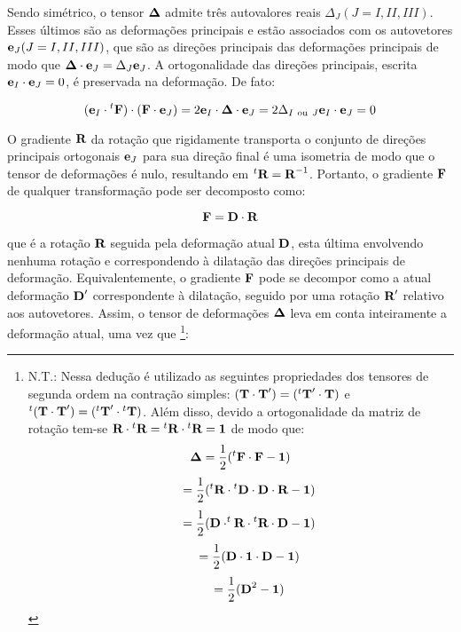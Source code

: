 \documentclass[
	11pt, %
	fleqn, %
	a4paper, %
]{LegrandOrangeBook}
\begin{document}
Sendo simétrico, o tensor $\bm{\Delta}$ admite três autovalores reais $\Delta_J (J=I,II,III)$. Esses últimos são as deformações principais e estão associados com os autovetores $\textbf{e}_J (J=I,II,III)$, que são as direções principais das deformações principais de modo que $\bm{\Delta} \cdot \textbf{e}_J = \Delta_J \textbf{e}_J$. A ortogonalidade das direções principais, escrita $\textbf{e}_I \cdot \textbf{e}_J = 0$, é preservada na deformação. De fato:

\begin{equation}
	\label{eq:eIFFeJ}	
	(\textbf{e}_I \cdot {}^t \textbf{F}) \cdot (\textbf{F} \cdot \textbf{e}_J) = 2\textbf{e}_I \cdot \bm{\Delta} \cdot \textbf{e}_J = 2 \Delta_{I~\text{ou}~J} \textbf{e}_I \cdot \textbf{e}_J = 0
\end{equation}

O gradiente $\textbf{R}$ da rotação que rigidamente transporta o conjunto de direções principais ortogonais $\textbf{e}_J$ para sua direção final é uma isometria de modo que o tensor de deformações é nulo, resultando em ${}^t\textbf{R} = \textbf{R}^{-1}$. Portanto, o gradiente $\textbf{F}$ de qualquer transformação pode ser decomposto como:

\begin{equation}
	\label{eq:F=DR}	
	\textbf{F} = \textbf{D} \cdot \textbf{R}
\end{equation}

que é a rotação $\textbf{R}$ seguida pela deformação atual $\textbf{D}$, esta última envolvendo nenhuma rotação e correspondendo à dilatação das direções principais de deformação. Equivalentemente, o gradiente $\textbf{F}$ pode se decompor como a atual deformação $\textbf{D}'$ correspondente à dilatação, seguido por uma rotação $\textbf{R}'$ relativo aos autovetores. Assim, o tensor de deformações $\bm{\Delta}$ leva em conta inteiramente a deformação atual, uma vez que \footnote{
N.T.: Nessa dedução é utilizado as seguintes propriedades dos tensores de segunda ordem na contração simples: $(\textbf{T} \cdot \textbf{T}') = ({}^t\textbf{T}' \cdot \textbf{T})$ e ${}^t(\textbf{T} \cdot \textbf{T}') =({}^t\textbf{T}' \cdot {}^t\textbf{T})$. Além disso, devido a ortogonalidade da matriz de rotação tem-se $\textbf{R} \cdot {}^t\textbf{R} = {}^t\textbf{R} \cdot {}^t\textbf{R} = \bm{1}$ de modo que:
\begin{displaymath}	
	\bm{\Delta} = \dfrac{1}{2}({}^t\textbf{F} \cdot \textbf{F} - \bm{1})
\end{displaymath}
\begin{displaymath}	
	~~~~ = \dfrac{1}{2}({}^t\textbf{R} \cdot {}^t\textbf{D} \cdot \textbf{D} \cdot \textbf{R} - \bm{1})
\end{displaymath}
\begin{displaymath}	
	~~~~ = \dfrac{1}{2}(\textbf{D} \cdot ^{t}\textbf{R} \cdot {}^t\textbf{R} \cdot \textbf{D} - \bm{1})
\end{displaymath}
\begin{displaymath}	
	~~~~ = \dfrac{1}{2}(\textbf{D} \cdot \bm{1} \cdot \textbf{D} - \bm{1})
\end{displaymath}
\begin{displaymath}	
	~~~~ = \dfrac{1}{2}(\textbf{D}^2- \bm{1})
\end{displaymath}

}:
\end{document}
